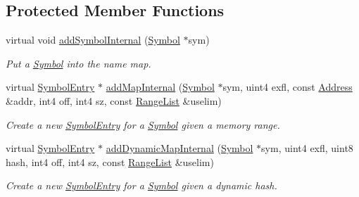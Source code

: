 \subsection*{Protected Member Functions}
\begin{DoxyCompactItemize}
\item 
virtual void \mbox{\hyperlink{class_scope_internal_af252bcb614abeea3af1750442087304a}{add\+Symbol\+Internal}} (\mbox{\hyperlink{class_symbol}{Symbol}} $\ast$sym)
\begin{DoxyCompactList}\small\item\em Put a \mbox{\hyperlink{class_symbol}{Symbol}} into the name map. \end{DoxyCompactList}\item 
virtual \mbox{\hyperlink{class_symbol_entry}{Symbol\+Entry}} $\ast$ \mbox{\hyperlink{class_scope_internal_a3b6e20fcb0624056020f2fc20d0a06ee}{add\+Map\+Internal}} (\mbox{\hyperlink{class_symbol}{Symbol}} $\ast$sym, uint4 exfl, const \mbox{\hyperlink{class_address}{Address}} \&addr, int4 off, int4 sz, const \mbox{\hyperlink{class_range_list}{Range\+List}} \&uselim)
\begin{DoxyCompactList}\small\item\em Create a new \mbox{\hyperlink{class_symbol_entry}{Symbol\+Entry}} for a \mbox{\hyperlink{class_symbol}{Symbol}} given a memory range. \end{DoxyCompactList}\item 
virtual \mbox{\hyperlink{class_symbol_entry}{Symbol\+Entry}} $\ast$ \mbox{\hyperlink{class_scope_internal_abd7bd6f565efa0e9eb5a7415fab0fca5}{add\+Dynamic\+Map\+Internal}} (\mbox{\hyperlink{class_symbol}{Symbol}} $\ast$sym, uint4 exfl, uint8 hash, int4 off, int4 sz, const \mbox{\hyperlink{class_range_list}{Range\+List}} \&uselim)
\begin{DoxyCompactList}\small\item\em Create a new \mbox{\hyperlink{class_symbol_entry}{Symbol\+Entry}} for a \mbox{\hyperlink{class_symbol}{Symbol}} given a dynamic hash. \end{DoxyCompactList}\end{DoxyCompactItemize}
